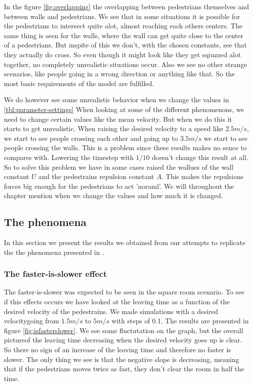 In the figure \ref{fig:overlapping} the overlapping between pedestrians
themselves and between walls and pedestrians. We see that in some situations
it is possible for the pedestrians to intersect quite alot, almost reaching
each others centers. The same thing is seen for the walls, where the wall
can get quite close to the center of a pedestrians. But inspite of this
we don't, with the chosen constants, see that they actually do cross. So
even though it might look like they get sqiuzzed alot together, no completely
unrealistic situations occur. Also we see no other strange scenarios, like
people going in a wrong direction or anything like that. So the most basic
requirements of the model are fulfilled.

We do however see some unrealistic behavior when we change the values in
\ref{tbl:parameter-settings} When looking at some of the different phenomenons,
we need to change certain values like the mean velocity. But when we do
this it starts to get unrealistic. When raising the desired velocity to
a speed like $2.5m/s$, we start to see people crossing each other and going
up to $3.5m/s$ we start to see people crossing the walls. This is a problem
since these results makes no sence to compares with. Lowering the timestep
with $1/10$ doesn't change this result at all. So to solve this problem we
have in some cases raised the wallues of the wall constant $U$ and the
pedestrains repulsion constant $A$. This makes the repulsions forces
big enough for the pedestrians to act 'noraml'. We will throughout the
chapter mention when we change the values and how much it is changed.

\subsection{The phenomena}\label{subsec:ThePhenomena}
In this section we present the results we obtained from our attempts 
to replicate the the phenomena presented in \cite{self-org}.

\subsubsection{The faster-is-slower effect}
The faster-is-slower was expected to be seen in the square room scenario.
To see if this effects occurs we have looked at the leaving time as a function
of the desired velocity of the pedestrains. We made simulations with a desired 
velocitygoing from $1.5m/s$ to $5m/s$ with steps of 0.1. The results are presented 
in figure \ref{fig:isfasterslower}. We see some fluctutation on the graph, but the 
overall pictureof the leaving time decreasing when the desired velocity goes up is 
clear. So there no sign of an increase of the leaving time and therefore no faster 
is slower. The only thing we see is that the negative slope is decreasing, meaning 
that if the pedestrians moves twice as fast, they don't clear the room in half the 
time.

